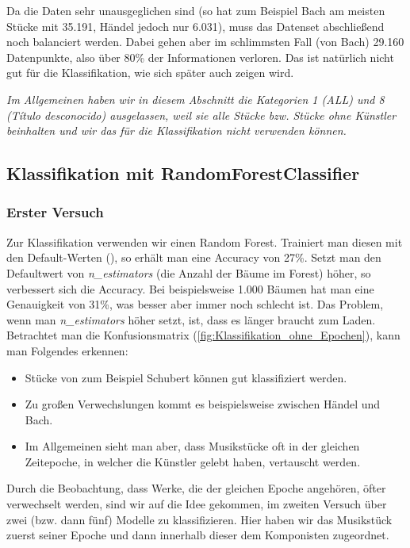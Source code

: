 Da die Daten sehr unausgeglichen sind (so hat zum Beispiel Bach am meisten Stücke mit 35.191, Händel jedoch nur 6.031), muss das Datenset abschließend noch balanciert werden. 
Dabei gehen aber im schlimmsten Fall (von Bach) 29.160 Datenpunkte, also über 80\% der Informationen verloren. Das ist natürlich nicht gut für die Klassifikation, wie sich später auch zeigen wird.


\textit{Im Allgemeinen haben wir in diesem Abschnitt die Kategorien 1 (ALL) und 8 (Título desconocido) ausgelassen, weil sie alle Stücke bzw. Stücke ohne Künstler beinhalten und wir das 
für die Klassifikation nicht verwenden können.}


\subsection{Klassifikation mit RandomForestClassifier}
\subsubsection{Erster Versuch}
Zur Klassifikation verwenden wir einen Random Forest. 
Trainiert man diesen mit den Default-Werten (\cite{RandomForestClassifier}), so erhält man eine Accuracy von 27\%. Setzt man den Defaultwert von \emph{n\_estimators} (die Anzahl
der Bäume im Forest) höher, so verbessert sich die Accuracy. Bei beispielsweise 1.000 Bäumen hat man eine Genauigkeit von 31\%, was besser aber immer noch schlecht ist.
Das Problem, wenn man \emph{n\_estimators} höher setzt, ist, dass es länger braucht zum Laden. 
Betrachtet man die Konfusionsmatrix (\ref{fig:Klassifikation_ohne_Epochen}), kann man Folgendes erkennen:

\begin{itemize}
    \item Stücke von zum Beispiel Schubert können gut klassifiziert werden.
    \item Zu großen Verwechslungen kommt es beispielsweise zwischen Händel und Bach.
    \item Im Allgemeinen sieht man aber, dass Musikstücke oft in der gleichen Zeitepoche, in welcher die Künstler gelebt haben, vertauscht werden.
\end{itemize}

Durch die Beobachtung, dass Werke, die der gleichen Epoche angehören, öfter verwechselt werden, sind wir
auf die Idee gekommen, im zweiten Versuch über zwei (bzw. dann fünf) Modelle zu klassifizieren. Hier haben wir das Musikstück zuerst seiner Epoche und dann innerhalb dieser dem Komponisten zugeordnet.

